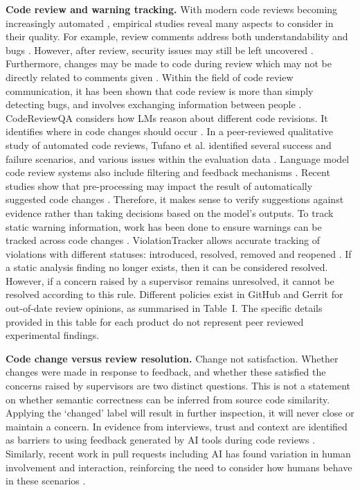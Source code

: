\documentclass[10pt,conference,letterpaper]{IEEEtran}
\begin{document}
\textbf{Code review and warning tracking.} With modern code reviews becoming increasingly automated \cite{roadmap2026}, empirical studies reveal many aspects to consider in their quality. For example, review comments address both understandability and bugs \cite{oliveira2025}. However, after review, security issues may still be left uncovered \cite{charoenwet2024}. Furthermore, changes may be made to code during review which may not be directly related to comments given \cite{fregnan2022}. Within the field of code review communication, it has been shown that code review is more than simply detecting bugs, and involves exchanging information between people \cite{dorner2025}. CodeReviewQA considers how LMs reason about different code revisions. It identifies where in code changes should occur \cite{codereviewqa2025}. In a peer-reviewed qualitative study of automated code reviews, Tufano et al. identified several success and failure scenarios, and various issues within the evaluation data \cite{tufano2024}. Language model code review systems also include filtering and feedback mechanisms \cite{bitsai2025}. Recent studies show that pre-processing may impact the result of automatically suggested code changes \cite{pirouzkhah2026}. Therefore, it makes sense to verify suggestions against evidence rather than taking decisions based on the model’s outputs. To track static warning information, work has been done to ensure warnings can be tracked across code changes \cite{warnings2024}. ViolationTracker allows accurate tracking of violations with different statuses: introduced, resolved, removed and reopened \cite{violation2023}. If a static analysis finding no longer exists, then it can be considered resolved. However, if a concern raised by a supervisor remains unresolved, it cannot be resolved according to this rule. Different policies exist in GitHub and Gerrit for out-of-date review opinions, as summarised in Table~I. The specific details provided in this table for each product do not represent peer reviewed experimental findings.

\textbf{Code change versus review resolution.} Change not satisfaction. Whether changes were made in response to feedback, and whether these satisfied the concerns raised by supervisors are two distinct questions. This is not a statement on whether semantic correctness can be inferred from source code similarity. Applying the ‘changed’ label will result in further inspection, it will never close or maintain a concern. In evidence from interviews, trust and context are identified as barriers to using feedback generated by AI tools during code reviews \cite{alami2025}. Similarly, recent work in pull requests including AI has found variation in human involvement and interaction, reinforcing the need to consider how humans behave in these scenarios \cite{gao2026,njoku2026}.
\end{document}
